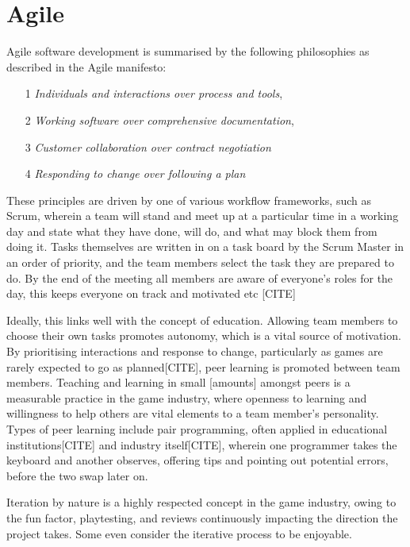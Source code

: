 \documentclass{scrartcl}
\begin{document}

\section{Agile}
Agile software development is summarised by the following philosophies as described in the Agile manifesto:

\begin{itemize}
\item[1]\textit{Individuals and interactions over process and tools},
\item[2]\textit{Working software over comprehensive documentation},
\item[3]\textit{Customer collaboration over contract negotiation}
\item[4]\textit{Responding to change over following a plan} \cite{agile}
\end{itemize}

These principles are driven by one of various workflow frameworks, such as Scrum, wherein a team will stand and meet up at a particular time in a working day and state what they have done, will do, and what may block them from doing it. Tasks themselves are written in on a task board by the Scrum Master in an order of priority, and the team members select the task they are prepared to do. By the end of the meeting all members are aware of everyone's roles for the day, this keeps everyone on track and motivated etc [CITE]

Ideally, this links well with the concept of education. Allowing team members to choose their own tasks promotes autonomy, which is a vital source of motivation. \cite{motivation} By prioritising interactions and response to change, particularly as games are rarely expected to go as planned[CITE], peer learning is promoted between team members. Teaching and learning in small [amounts] amongst peers is a measurable practice in the game industry, where openness to learning and willingness to help others \cite{collaboration} are vital elements to a team member's personality. Types of peer learning include pair programming, often applied in educational institutions[CITE] and industry itself[CITE], wherein one programmer takes the keyboard and another observes, offering tips and pointing out potential errors, before the two swap later on.

Iteration by nature is a highly respected concept in the game industry, owing to the fun factor, playtesting, and reviews continuously impacting the direction the project takes. Some even consider the iterative process to be enjoyable\cite{iteration}.
\end{document}
